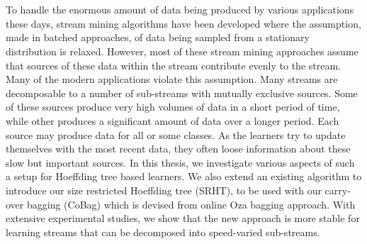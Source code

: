 \chapter{\abstractname}
To handle the enormous amount of data being produced by various applications these days, stream mining algorithms have been developed where the assumption, made in batched approaches, of data being sampled from a stationary distribution is relaxed.
However, most of these stream mining approaches assume that sources of these data within the stream contribute evenly to the stream.
Many of the modern applications violate this assumption. Many streams are decomposable to a number of sub-streams with mutually exclusive sources. Some of these sources produce very high volumes of data in a short period of time, while other produces a significant amount of data over a longer period. Each source may produce data for all or some classes.
As the learners try to update themselves with the most recent data, they often loose information about these slow but important sources.
In this thesis, we investigate various aspects of such a setup for Hoeffding tree based learners. We also extend an existing algorithm to introduce our size restricted Hoeffding tree (SRHT), to be used with our carry-over bagging (CoBag) which is devised from online Oza bagging approach. With extensive experimental studies, we show that the new approach is more stable for learning streams that can be decomposed into speed-varied sub-streams.

